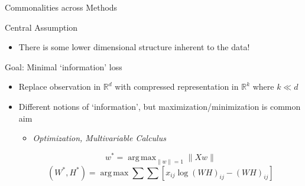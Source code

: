 \documentclass{beamer}
\DeclareMathOperator*{\argmax}{arg\,max}
\begin{document}
\begin{frame}{Commonalities across Methods}
\begin{block}{Central Assumption}
\begin{itemize}
	\item There is some lower dimensional structure inherent to the data! \pause
\end{itemize}
\end{block}

\begin{block}{Goal: Minimal `information' loss}
\begin{itemize}
 \item Replace observation in $\mathbb{R}^d$ with compressed representation in $\mathbb{R}^k$ where $k \ll d$ 
 \item Different notions of `information', but maximization/minimization is common aim
 	\begin{itemize}
 		\item \emph{Optimization, Multivariable Calculus}
 	\end{itemize}
 	$$w^* = \argmax_{\| w\| = 1} \| X w\| $$
 	$$ (W^*,H^*) = \argmax \sum \sum [x_{ij} \log (WH)_{ij} - (WH)_{ij} ]$$
\end{itemize}
\end{block}

\end{frame}
\end{document}
